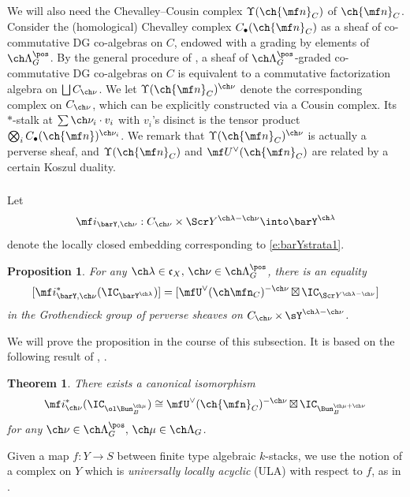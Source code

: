 \documentclass[final]{amsart}
\newtheorem{thm}[subsubsection]{Theorem}
\newtheorem{prop}[subsubsection]{Proposition}
\theoremstyle{remark}
\theoremstyle{definition}
\DeclareMathOperator*{\xt}{\times}
\DeclareMathOperator*{\bt}{\boxtimes}
\numberwithin{equation}{section}
\begin{document}
We will also need the Chevalley--Cousin complex $\Upsilon(\ch{\mf n}_C)$ 
of $\ch{\mf n}_C$. 
Consider the (homological) Chevalley complex $C_\bullet(\ch{\mf n}_C)$
as a sheaf of co-commutative DG co-algebras on $C$, endowed with a grading by elements of
$\ch\Lambda^\pos_G$. 
By the general procedure of \cite[\S 3.4]{BD:chiral}, a sheaf of $\ch\Lambda^\pos_G$-graded
co-commutative DG co-algebras on $C$ is equivalent to a commutative factorization algebra 
on $\bigsqcup C_{\ch\nu}$. We let $\Upsilon(\ch{\mf n}_C)^{\ch\nu}$ denote
the corresponding complex on $C_{\ch\nu}$, which can be explicitly constructed
via a Cousin complex. 
Its $*$-stalk at $\sum \ch\nu_i \cdot v_i$ with $v_i$'s disinct is 
the tensor product $\bigotimes_i C_\bullet(\ch{\mf n})^{\ch\nu_i}$. 
We remark that $\Upsilon(\ch{\mf n}_C)^{\ch\nu}$ is actually
a perverse sheaf, and $\Upsilon(\ch{\mf n}_C)$ and $\mf U^\vee(\ch{\mf n}_C)$ are
related by a certain Koszul duality.


\subsubsection{} Let 
\[ \mf i_{\barY,\ch\nu} : C_{\ch\nu} \times \Scr Y^{\ch\lambda-\ch\nu}
\into \barY^{\ch\lambda} \]
denote the locally closed embedding corresponding to \eqref{e:barYstrata1}. 

\begin{prop} \label{prop:ICbarY}
For any $\ch\lambda\in \mathfrak c_X,\, \ch\nu\in \ch\Lambda^\pos_G$, 
there is an equality 
\[ 
[\mf i^*_{\barY,\ch\nu}(\IC_{\barY^{\ch\lambda}}) ]
= [\mfU^\vee(\ch\mfn_C)^{-\ch\nu} \bt \IC_{\Scr Y^{\ch\lambda-\ch\nu}}] 
\]
in the Grothendieck group of perverse sheaves on $C_{\ch\nu} \xt \sY^{\ch\lambda-\ch\nu}$.
\end{prop}

We will prove the proposition in the course of this subsection. It is based on the following result of {\cite[Proposition 4.4]{BG2}, \cite[Theorem 1.12]{BFGM}}. 
\begin{thm}
\label{thm:BFGM}
There exists a canonical isomorphism 
\[ \mf i_{\ch\nu}^* (\IC_{\ol\Bun_B^{\ch\mu}}) \cong 
\mfU^\vee(\ch{\mfn}_C)^{-\ch\nu} \bt \IC_{\Bun_B^{\ch\mu+\ch\nu}} 
\]
for any $\ch\nu\in \ch\Lambda^\pos_G,\, \ch\mu\in \ch\Lambda_G$. 
\end{thm}



Given a map $f : Y \to S$ between finite type algebraic $k$-stacks, 
we use the notion of a complex on $Y$ which is 
\emph{universally locally acyclic} (ULA) with 
respect to $f$, as in \cite[D\'efinition 2.12]{SGA4h}.
\end{document}
